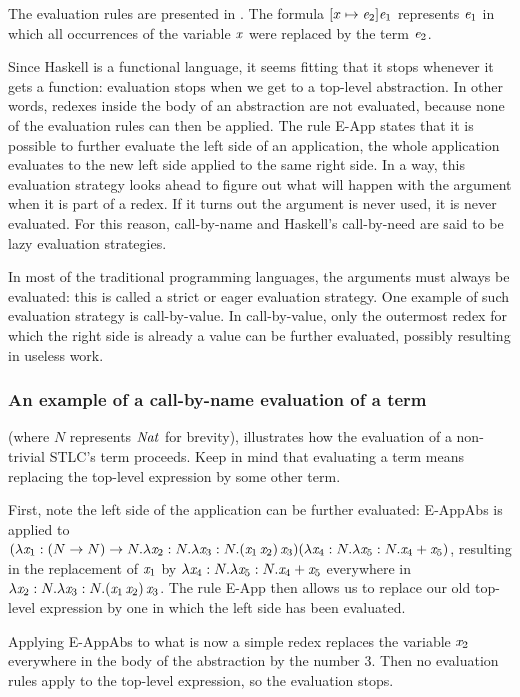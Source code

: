 The evaluation rules are presented in . The formula $[x\mapsto\mathit{e}_2]\mathit{e}_1$ represents $\mathit{e}_1$ in which all occurrences of the variable $\mathit{x}$ were replaced by the term $\mathit{e}_2$.

Since Haskell is a functional language, it seems fitting that it stops whenever it gets a function: evaluation stops when we get to a top-level abstraction. In other words, redexes inside the body of an abstraction are not evaluated, because none of the evaluation rules can then be applied. The rule E-App states that it is possible to further evaluate the left side of an application, the whole application evaluates to the new left side applied to the same right side. In a way, this evaluation strategy looks ahead to figure out what will happen with the argument when it is part of a redex. If it turns out the argument is never used, it is never evaluated. For this reason, call-by-name and Haskell's call-by-need are said to be lazy evaluation strategies.

In most of the traditional programming languages, the arguments must always be evaluated: this is called a strict or eager evaluation strategy. One example of such evaluation strategy is call-by-value. In call-by-value, only the outermost redex for which the right side is already a value can be further evaluated, possibly resulting in useless work.
\subsubsection{An example of a call-by-name evaluation of a term}
 (where $N$ represents $\mathit{Nat}$ for brevity), illustrates how the evaluation of a non-trivial STLC's term proceeds. Keep in mind that evaluating a term means replacing the top-level expression by some other term.

First, note the left side of the application can be further evaluated: E-AppAbs is applied to $(\lambda \mathit{x}_1: (N \rightarrow N)\rightarrow N.\lambda \mathit{x}_2:N.\lambda \mathit{x}_3: N . (\mathit{x}_1 \, \mathit{x}_2)\,\mathit{x}_3) (\lambda \mathit{x}_4:N. \lambda \mathit{x}_5:N. \mathit{x}_4 + \mathit{x}_5)$, resulting in the replacement of $\mathit{x}_1$ by $\lambda \mathit{x}_4:N. \lambda \mathit{x}_5:N. \mathit{x}_4 + \mathit{x}_5$ everywhere in $\lambda \mathit{x}_2:N.\lambda \mathit{x}_3: N . (\mathit{x}_1 \, \mathit{x}_2)\,\mathit{x}_3$. The rule E-App then allows us to replace our old top-level expression by one in which the left side has been evaluated.

Applying E-AppAbs to what is now a simple redex replaces the variable $\mathit{x}_2$ everywhere in the body of the abstraction by the number $3$. Then no evaluation rules apply to the top-level expression, so the evaluation stops.

